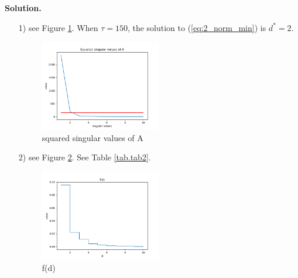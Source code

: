 \documentclass[english,onecolumn]{IEEEtran}
\begin{document}
\noindent
\textbf{Solution.}
\begin{enumerate}
    \item [1)]  see Figure \ref{fig.p5_1}. When $\tau = 150$, the solution to (\ref{eq:2_norm_min}) is $d^* = 2$.
        
    \begin{figure}[htbp]
            \centering
            \includegraphics[width=0.5\textwidth]{p5_1.png}
            \caption{squared singular values of A}
            \label{fig.p5_1}
    \end{figure}
    \newpage
    \item [2)] see Figure \ref{fig.p5_2}. See Table \ref{tab.tab2}.
    \begin{figure}[htbp]
        \centering
        \includegraphics[width=0.5\textwidth]{p5_2.png}
        \caption{f(d)}
        \label{fig.p5_2}
\end{figure}
\end{enumerate}
\end{document}
